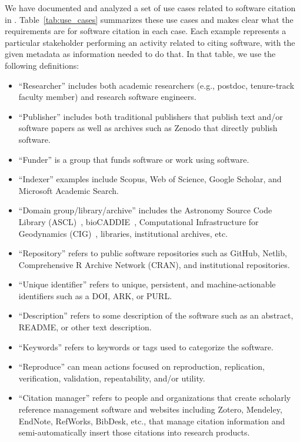 \documentclass[11pt, oneside]{amsart}
\begin{document}
We have documented and analyzed a set of use cases related to software citation
in \cite{SC-Use-Cases}. Table~\ref{tab:use_cases} summarizes these use cases and
makes clear what the requirements are for software citation in each case.
Each example represents a particular stakeholder performing an activity related to citing software, with the given metadata as information needed to do that.
In that table,
we use the following definitions:
\begin{itemize}

\item ``Researcher'' includes both academic researchers (e.g., postdoc,
tenure-track faculty member) and research software engineers.

\item ``Publisher'' includes both traditional publishers that publish text
and\slash or software papers as well as archives such as Zenodo that directly
publish software.

\item ``Funder'' is a group that funds software or work using software.

\item ``Indexer'' examples include Scopus, Web of Science, Google Scholar,
and Microsoft Academic Search.

\item ``Domain group\slash library\slash archive'' includes the Astronomy Source Code Library (ASCL)~\cite{ascl},
bioCADDIE~\cite{bioCADDIE}, Computational Infrastructure for Geodynamics (CIG)~\cite{CIG}, libraries, institutional archives, etc.

\item ``Repository'' refers to public software repositories such as GitHub, Netlib, Comprehensive R Archive
Network (CRAN), and institutional repositories.

\item ``Unique identifier'' refers to unique, persistent, and machine-actionable identifiers such as a DOI, ARK, or PURL.

\item ``Description'' refers to some description of the software such as an abstract, README, or other text description.

\item ``Keywords'' refers to keywords or tags used to categorize the software.

\item ``Reproduce'' can mean actions focused on reproduction, replication, verification, validation, repeatability, and\slash or utility.

\item ``Citation manager'' refers to people and organizations that create scholarly reference
management software and websites including Zotero, Mendeley, EndNote, RefWorks, BibDesk, etc.,
that manage citation information and semi-automatically insert those citations into research products.

\end{itemize}
\end{document}
